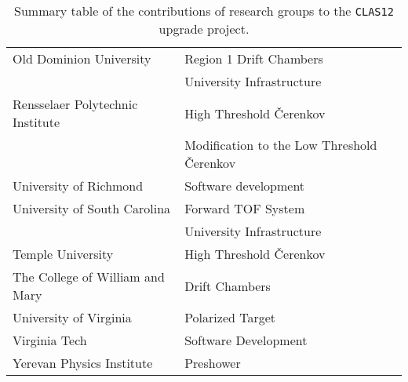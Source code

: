 \begin{table}
\begin{small}
\begin{center}
\begin{tabular}{||l||l||}
Old Dominion University                & Region 1 Drift Chambers \\ 
                                       & University Infrastructure \\ \hline
Rensselaer Polytechnic Institute       & High Threshold {\v C}erenkov \\ 
                                       & Modification to the Low Threshold {\v C}erenkov \\ \hline
University of Richmond                 & Software development \\ \hline 
University of South Carolina           & Forward TOF System \\ 
                                       & University Infrastructure \\ \hline 
Temple University                      & High Threshold {\v C}erenkov  \\ \hline
The College of William and Mary        & Drift Chambers \\ \hline
University of Virginia                 & Polarized Target \\ \hline
Virginia Tech                          & Software Development \\ \hline
Yerevan Physics Institute              & Preshower        \\ \hline \hline
\end{tabular}
\end{center}
\end{small}
\caption{\small{Summary table of the contributions of research groups
to the {\tt CLAS12} upgrade project.}}
\label{work_summary}
\end{table}

